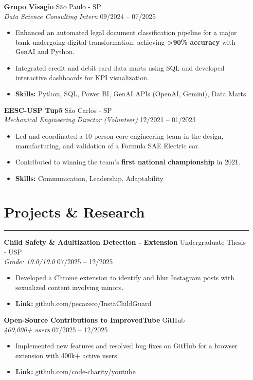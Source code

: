 \documentclass[10pt,a4paper]{article}
\begin{document}
\vspace{1mm}
\textbf{Grupo Visagio} \hfill São Paulo - SP \\
\textit{Data Science Consulting Intern} \hfill 09/2024 -- 07/2025
\begin{itemize}[nosep]
    \item Enhanced an automated legal document classification pipeline for a major bank undergoing digital transformation, achieving \textbf{>90\% accuracy} with GenAI and Python.
    \item Integrated credit and debit card data marts using SQL and developed interactive dashboards for KPI visualization.
    \item \textbf{Skills:} Python, SQL, Power BI, GenAI APIs (OpenAI, Gemini), Data Marts
\end{itemize}

\vspace{1mm}
\textbf{EESC-USP Tupã} \hfill São Carlos - SP \\
\textit{Mechanical Engineering Director (Volunteer)} \hfill 12/2021 -- 01/2023
\begin{itemize}[nosep]
    \item Led and coordinated a 10-person core engineering team in the design, manufacturing, and validation of a Formula SAE Electric car. 
    \item Contributed to winning the team's \textbf{first national championship} in 2021.
    \item \textbf{Skills:} Communication, Leadership, Adaptability
\end{itemize}

\section*{Projects \& Research}
\hrule \vspace{2mm}
\textbf{Child Safety \& Adultization Detection - Extension} \hfill Undergraduate Thesis - USP \\
\textit{Grade: 10.0/10.0} \hfill 07/2025 -- 12/2025
\begin{itemize}[nosep]
    \item Developed a Chrome extension to identify and blur Instagram posts with sexualized content involving minors.
    \item \textbf{Link:} github.com/pecazeco/InstaChildGuard
\end{itemize}

\vspace{1mm}
\textbf{Open-Source Contributions to ImprovedTube} \hfill GitHub \\
\textit{400,000+ users} \hfill 07/2025 -- 12/2025
\begin{itemize}[nosep]
    \item Implemented new features and resolved bug fixes on GitHub for a browser extension with 400k+ active users.
    \item \textbf{Link:} github.com/code-charity/youtube
\end{itemize}
\end{document}
